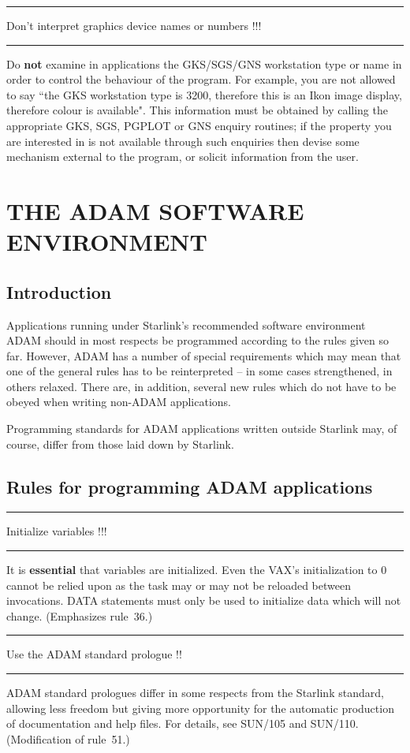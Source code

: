 \documentclass[twoside,11pt]{article}
\newcounter{sruleno}
\newcommand{\srule}[1]{
    \addtocounter{sruleno}{1}
    \goodbreak
    \rule[0.5ex]{\textwidth}{0.3mm}
    {\Large #1 \hfill {\thesruleno}}
    \rule[0.5ex]{\textwidth}{0.1mm}
}
\newcommand{\srule}[1]{
       \addtocounter{sruleno}{1}
       \begin{rawhtml} <HR> \end{rawhtml}
       {\Large \thesruleno}~~~~{\Large #1}
       \begin{rawhtml} <HR> \end{rawhtml}
       \end{tabular}
  }
\renewcommand{\_}{{\tt\char'137}}
\begin{document}
\srule{Don't interpret graphics device names or numbers !!!}
Do {\bf not} examine in applications the GKS/SGS/GNS workstation
type or name in order to control the behaviour of the
program.  For example, you are not allowed to say ``the
GKS workstation type is 3200, therefore this is an
Ikon image display, therefore colour is available".  This
information must be obtained by calling the appropriate
GKS, SGS, \mbox{PGPLOT} or GNS enquiry routines;  if the property
you are interested in is not available through such
enquiries then devise some mechanism external to the
program, or solicit information from the user.

\newpage
\section{THE ADAM SOFTWARE ENVIRONMENT}

\subsection{Introduction}
Applications running under Starlink's recommended software
environment ADAM should in most respects be programmed
according to the rules given so far.  However, ADAM has a number
of special requirements which may mean that one of the
general rules has to be reinterpreted -- in some cases
strengthened, in others relaxed.  There are, in addition,
several new rules which do not have to be obeyed when
writing non-ADAM applications.

Programming standards for ADAM applications written outside
Starlink may, of course, differ from those laid down by Starlink.

\goodbreak
\subsection{Rules for programming ADAM applications}

\srule{Initialize variables !!!}
It is {\bf essential} that variables are initialized.
Even the VAX's initialization to 0 cannot be relied upon as the task may or
may not be reloaded between invocations.
DATA statements must only be used to initialize data which will not change.
(Emphasizes rule~36.)

\srule{Use the ADAM standard prologue !!}
ADAM standard prologues differ in some respects from the Starlink
standard, allowing less freedom but giving more opportunity for
the automatic production of documentation and help files.
For details, see SUN/105 and SUN/110.
(Modification of rule~51.)
\end{document}
